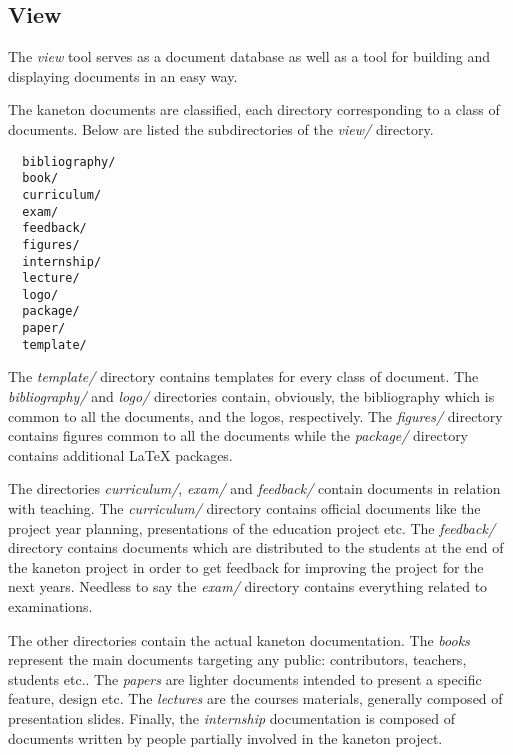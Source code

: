 %
%
%
%
%
%

%
%

\subsection{View}
\label{section:view}

The \textit{view} tool serves as a document database as well as a tool for
building and displaying documents in an easy way.

The kaneton documents are classified, each directory corresponding to a
class of documents. Below are listed the subdirectories of the \textit{view/}
directory.

\begin{verbatim}
  bibliography/
  book/
  curriculum/
  exam/
  feedback/
  figures/
  internship/
  lecture/
  logo/
  package/
  paper/
  template/
\end{verbatim}

The \textit{template/} directory contains templates for every class of
document. The \textit{bibliography/} and \textit{logo/} directories contain,
obviously, the bibliography which is common to all the documents, and the
logos, respectively. The \textit{figures/} directory contains figures
common to all the documents while the \textit{package/} directory contains
additional {\LaTeX} packages.

The directories \textit{curriculum/}, \textit{exam/} and \textit{feedback/}
contain documents in relation with teaching. The \textit{curriculum/}
directory contains official documents like the project year planning,
presentations of the education project etc. The \textit{feedback/}
directory contains documents which are distributed to the students
at the end of the kaneton project in order to get feedback for improving
the project for the next years. Needless to say the \textit{exam/} directory
contains everything related to examinations.

The other directories contain the actual kaneton documentation. The
\textit{books} represent the main documents targeting any public:
contributors, teachers, students etc.. The \textit{papers} are lighter
documents intended to present a specific feature, design etc. The
\textit{lectures} are the courses materials, generally composed of
presentation slides. Finally, the \textit{internship} documentation is
composed of documents written by people partially involved in the kaneton
project.


